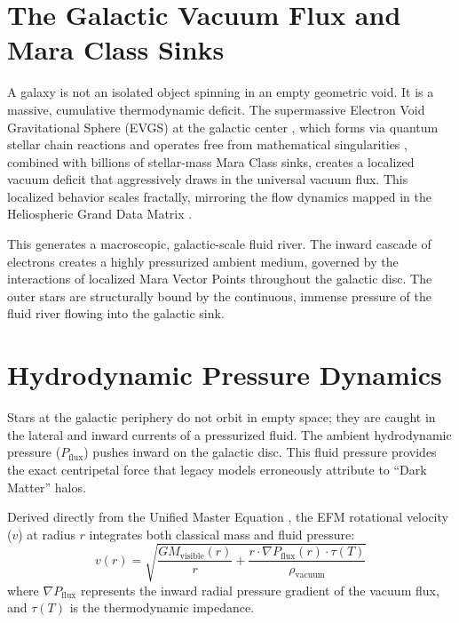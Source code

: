 \documentclass[11pt, a4paper, table]{article}
\begin{document}
\clearpage
\section{The Galactic Vacuum Flux and Mara Class Sinks}
  A galaxy is not an isolated object spinning in an empty geometric void. It is a massive, cumulative thermodynamic deficit. The supermassive Electron Void Gravitational Sphere (EVGS) at the galactic center \cite{marabut2026m8}, which forms via quantum stellar chain reactions \cite{marabut2026m4} and operates free from mathematical singularities \cite{marabut2026m10}, combined with billions of stellar-mass Mara Class sinks, creates a localized vacuum deficit that aggressively draws in the universal vacuum flux. This localized behavior scales fractally, mirroring the flow dynamics mapped in the Heliospheric Grand Data Matrix \cite{marabut2026m5}.

  This generates a macroscopic, galactic-scale fluid river. The inward cascade of electrons creates a highly pressurized ambient medium, governed by the interactions of localized Mara Vector Points throughout the galactic disc. The outer stars are structurally bound by the continuous, immense pressure of the fluid river flowing into the galactic sink.

\section{Hydrodynamic Pressure Dynamics}
  Stars at the galactic periphery do not orbit in empty space; they are caught in the lateral and inward currents of a pressurized fluid. The ambient hydrodynamic pressure ($P_{\text{flux}}$) pushes inward on the galactic disc. This fluid pressure provides the exact centripetal force that legacy models erroneously attribute to ``Dark Matter'' halos. 

  Derived directly from the Unified Master Equation \cite{marabut2026m6}, the EFM rotational velocity ($v$) at radius $r$ integrates both classical mass and fluid pressure:
  \begin{equation}
    v(r) = \sqrt{ \frac{G M_{\text{visible}}(r)}{r} + \frac{r \cdot \nabla P_{\text{flux}}(r) \cdot \tau(T)}{\rho_{\text{vacuum}}} }
    \label{eq:efm_rotation}
  \end{equation}
  where $\nabla P_{\text{flux}}$ represents the inward radial pressure gradient of the vacuum flux, and $\tau(T)$ is the thermodynamic impedance. 
\end{document}
